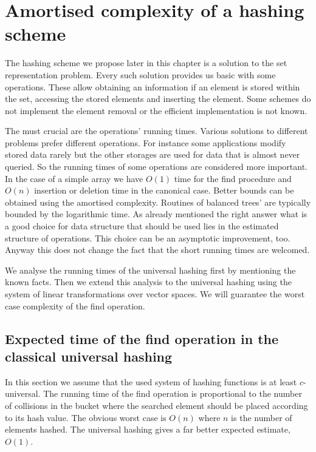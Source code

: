 \chapter{Amortised complexity of a hashing scheme}

The hashing scheme we propose later in this chapter is a solution to the set representation problem. Every such solution provides us basic with some operations. These allow obtaining an information if an element is stored within the set, accessing the stored elements and inserting the element. Some schemes do not implement the element removal or the efficient implementation is not known.

The must crucial are the operations' running times. Various solutions to different problems prefer different operations. For instance some applications modify stored data rarely but the other storages are used for data that is almost never queried. So the running times of some operations are considered more important. In the case of a simple array we have $O(1)$ time for the find procedure and $O(n)$ insertion or deletion time in the canonical case. Better bounds can be obtained using the amortised complexity. Routines of balanced trees' are typically bounded by the logarithmic time. As already mentioned the right answer what is a good choice for data structure that should be used lies in the estimated structure of operations. This choice can be an asymptotic improvement, too. Anyway this does not change the fact that the short running times are welcomed.

We analyse the running times of the universal hashing first by mentioning the known facts. Then we extend this analysis to the universal hashing using the system of linear transformations over vector spaces. We will guarantee the worst case complexity of the find operation.

\section{Expected time of the find operation in the classical universal hashing}
In this section we assume that the used system of hashing functions is at least $c$-universal. The running time of the find operation is proportional to the number of collisions in the bucket where the searched element should be placed according to its hash value. The obvious worst case is $O(n)$ where $n$ is the number of elements hashed. The universal hashing gives a far better expected estimate, $O(1)$.


